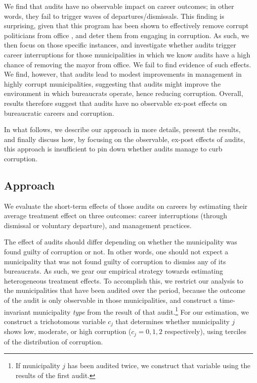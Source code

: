 \documentclass[12pt,a4paper]{article}
\theoremstyle{definition}
\begin{document}
We find that audits have no observable impact on career outcomes; in other words, they fail to trigger waves of departures/dismissals. This finding is surprising, given that this  program has been shown to effectively remove corrupt politicians from office \citep{ferraz_exposing_2008,ferraz_electoral_2011}, and deter them from engaging in corruption. As such, we then focus on those specific instances, and investigate whether audits trigger career interruptions for those municipalities in which we know audits have a high chance of removing the mayor from office. We fail to find evidence of such effects. We find, however, that audits lead to modest improvements in management in highly corrupt municipalities, suggesting that audits might improve the environment in which bureaucrats operate, hence reducing corruption. Overall, results therefore suggest that audits have no observable ex-post effects on bureaucratic careers and corruption. 

In what follows, we describe our approach in more details, present the results, and finally discuss how, by focusing on the observable, ex-post effects of audits, this approach is insufficient to pin down whether audits manage to curb corruption.

\subsection{Approach}
\label{sub:empiricalStrategy}

We evaluate the short-term effects of those audits on careers by estimating their average treatment effect on three outcomes: career interruptions (through dismissal or voluntary departure), and management practices. 

The effect of audits should differ depending on whether the municipality was found guilty of corruption or not. In other words, one should not expect a municipality that was not found guilty of corruption to dismiss any of its bureaucrats. As such, we gear our empirical strategy towards estimating heterogeneous treatment effects. To accomplish this, we restrict our analysis to the municipalities that have been audited over the period, because the outcome of the audit is only observable in those municipalities, and construct a time-invariant municipality \emph{type} from the result of that audit.\footnote{If municipality $j$ has been audited twice, we construct that variable using the results of the first audit.} For our estimation, we construct a trichotomous variable $c_j$ that determines whether municipality $j$ shows low, moderate, or high corruption ($c_j = 0, 1, 2$ respectively), using terciles of the distribution of corruption. 
\end{document}
